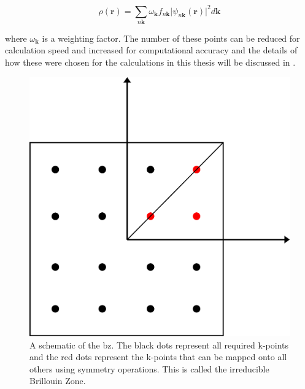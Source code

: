 \begin{equation}
\rho(\mathbf{r}) = \sum_{n\mathbf{k}} \omega_\mathbf{k} f_{n\mathbf{k}} \lvert \psi_{n\mathbf{k}}(\mathbf{r}) \rvert^2 d\mathbf{k}
\end{equation}

where \(\omega_\mathbf{k}\) is a weighting factor. The number of these points can be reduced for calculation speed and increased for computational accuracy and the details of how these were chosen for the calculations in this thesis will be discussed in . 

\begin{figure}
    \centering
    \includegraphics{Figures/Misc/Theory/BZ+IBZ.png}
    \captionsetup{font = footnotesize, justification = centering}
    \caption[A Schematic of the Brillouin Zone]{A schematic of the \acrshort{bz}. The black dots represent all required k-points and the red dots represent the k-points that can be mapped onto all others using symmetry operations. This is called the irreducible Brillouin Zone.}
    \label{fig:BZIBZ}
\end{figure}

